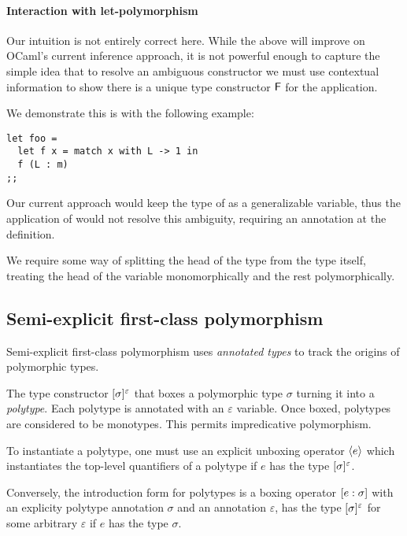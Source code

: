 \documentclass[acmsmall,screen,nonacm]{acmart}
\begin{document}
\paragraph{Interaction with let-polymorphism}

Our intuition is not entirely correct here. While the above will improve on
OCaml's current inference approach, it is not powerful enough to capture the
simple idea that to resolve an ambiguous constructor we must use contextual
information to show there is a unique type constructor $\mathsf{F}$ for the
application.

We demonstrate this is with the following example:
\begin{lstlisting}
let foo =
  let f x = match x with L -> 1 in 
  f (L : m)
;;
\end{lstlisting}
Our current approach would keep the type of  as a generalizable
variable, thus the application of  would not resolve this ambiguity,
requiring an annotation at the definition.

We require some way of splitting the head of the type from the type itself,
treating the head of the variable monomorphically and the rest
polymorphically.

\subsection{Semi-explicit first-class polymorphism}


Semi-explicit first-class polymorphism \citep{TODO} uses \textit{annotated
types} to track the origins of polymorphic types.

The type constructor $[\sigma]^{\varepsilon}$ that boxes a polymorphic
type $\sigma$ turning it into a \textit{polytype}. Each polytype is annotated
with an $\varepsilon$ variable.  Once boxed, polytypes are considered to be
monotypes. This permits impredicative polymorphism.

To instantiate a polytype, one must use an explicit unboxing operator
$\langle e \rangle$ which instantiates the top-level quantifiers of a polytype if $e$
has the type $[\sigma]^{\varepsilon}$.

Conversely, the introduction form for polytypes is a boxing operator $[ e : \sigma ]$ with an explicity polytype annotation $\sigma$ and an annotation
$\varepsilon$, has the type $[\sigma]^{\varepsilon}$ for some arbitrary 
$\varepsilon$ if $e$ has the type $\sigma$.
\end{document}
